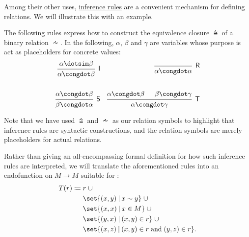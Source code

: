 \begin{example}\label{ex:fixed_point_recursion_for_relations}
  Among their other uses, \hyperref[def:inference_rule]{inference rules} are a convenient mechanism for defining relations. We will illustrate this with an example.

  The following rules express how to construct the \hyperref[thm:equivalence_closure]{equivalence closure} \( {\congdot} \) of a binary relation \( {\dotsim} \). In the following, \( \alpha \), \( \beta \) and \( \gamma \) are variables whose purpose is act as placeholders for concrete values:
  \begin{align*}
    \begin{prooftree}
      \hypo{ \alpha \dotsim \beta }
      \infer1[\logic{I}]{ \alpha \congdot \beta }
    \end{prooftree}
    &&
    \begin{prooftree}
      \infer0[\logic{R}]{ \alpha \congdot \alpha }
    \end{prooftree}
    \\\\
    \begin{prooftree}
      \hypo{ \alpha \congdot \beta }
      \infer1[\logic{S}]{ \beta \congdot \alpha }
    \end{prooftree}
    &&
    \begin{prooftree}
      \hypo{ \alpha \congdot \beta }
      \hypo{ \beta \congdot \gamma }
      \infer2[\logic{T}]{ \alpha \congdot \gamma }
    \end{prooftree}
  \end{align*}

  Note that we have used \( {\congdot} \) and \( {\dotsim} \) as our relation symbols to highlight that inference rules are syntactic constructions, and the relation symbols are merely placeholders for actual relations.

  Rather than giving an all-encompassing formal definition for how such inference rules are interpreted, we will translate the aforementioned rules into an endofunction on \( M \to M \) suitable for :
  \begin{equation*}
    \begin{aligned}
      T(r) \coloneqq \thickspace & r \thickspace {\cup} \\
                                 & \set{ (x, y) \given x \sim y } \thickspace {\cup} \\
                                 & \set{ (x, x) \given x \in M } \thickspace {\cup} \\
                                 & \set{ (y, x) \given (x, y) \in r } \thickspace {\cup} \\
                                 & \set{ (x, z) \given (x, y) \in r \T{and} (y, z) \in r }.
    \end{aligned}
  \end{equation*}


\end{example}

